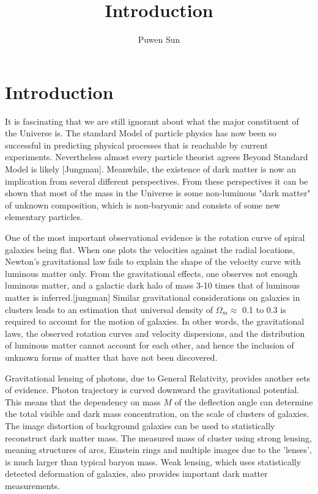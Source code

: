 \documentclass[12pt]{article}
\begin{document}
\title{Introduction}
\author{Puwen Sun}
\date{}
\maketitle

\section{Introduction}
It is fascinating that we are still ignorant about what the major constituent of the Universe is. The standard Model of particle physics has now been so successful in predicting physical processes that is reachable by current experiments. Nevertheless almost every particle theorist agrees Beyond Standard Model is likely [Jungman]. Meanwhile, the existence of dark matter is now an implication from several different perspectives. From these perspectives it can be shown that most of the mass in the Universe is some non-luminous "dark matter" of unknown composition, which is non-baryonic and consists of some new elementary particles. 

One of the most important observational evidence is the rotation curve of spiral galaxies being flat. When one plots the velocities against the radial locations, Newton's gravitational law fails to explain the shape of the velocity curve with luminous matter only.  From the gravitational effects, one observes not enough luminous matter, and a galactic dark halo of mass 3-10 times that of luminous matter is inferred.[jungman] Similar gravitational considerations on galaxies in clusters leads to an estimation that universal density of $\Omega_m \approx $ 0.1 to 0.3 is required to account for the motion of galaxies. In other words, the gravitational laws, the observed rotation curves and velocity dispersions, and the distribution of luminous matter cannot account for each other, and hence the inclusion of unknown forms of matter that have not been discovered. 

Gravitational lensing of photons, due to General Relativity, provides another sets of evidence. Photon trajectory is curved downward the gravitational potential. This means that the dependency on mass $M$ of the deflection angle can determine the total visible and dark mass concentration, on the scale of clusters of galaxies. The image distortion of background galaxies can be used to statistically reconstruct dark matter mass. The measured mass of cluster using strong lensing, meaning structures of arcs, Einstein rings and multiple images due to the 'lenses', is much larger than typical baryon mass. Weak lensing, which uses statistically detected deformation of galaxies, also provides important dark matter measurements. 
\end{document}
